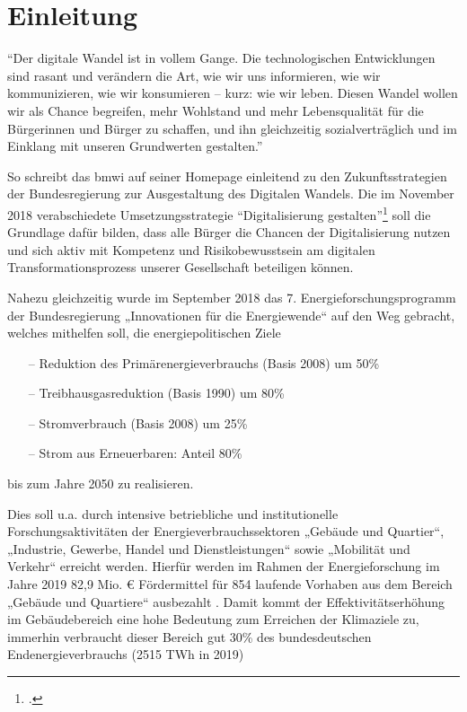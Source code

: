 
\chapter{Einleitung}
\enquote{Der digitale Wandel ist in vollem Gange. Die technologischen Entwicklungen sind rasant und verändern die Art, wie wir uns informieren, wie wir kommunizieren, wie wir konsumieren – kurz: wie wir leben. Diesen Wandel wollen wir als Chance begreifen, mehr Wohlstand und mehr Lebensqualität für die Bürgerinnen und Bürger zu schaffen, und ihn gleichzeitig sozialverträglich und im Einklang mit unseren Grundwerten gestalten.} \cite{bmwi2021}

So schreibt das \gls{bmwi} auf seiner Homepage einleitend zu den Zukunftsstrategien der Bundesregierung zur Ausgestaltung des Digitalen Wandels. Die im November 2018 verabschiedete Umsetzungsstrategie \enquote{Digitalisierung gestalten}\footcite{bundesregierung2020} soll die Grundlage dafür bilden, dass alle Bürger die Chancen der Digitalisierung nutzen und sich aktiv mit Kompetenz und Risikobewusstsein am digitalen Transformationsprozess unserer Gesellschaft beteiligen können. 

Nahezu gleichzeitig wurde im September 2018 das 7. Energieforschungsprogramm der Bundesregierung „Innovationen für die Energiewende“ auf den Weg gebracht, welches mithelfen soll, die energiepolitischen Ziele 
\begin{itemize}
    \itemsep0em
    \item[--] Reduktion des Primärenergieverbrauchs (Basis 2008) um 50\%
    \item[--] Treibhausgasreduktion (Basis 1990) um 80\%
    \item[--] Stromverbrauch (Basis 2008) um 25\%
    \item[--] Strom aus Erneuerbaren: Anteil 80\%
\end{itemize}
bis zum Jahre 2050 zu realisieren.

Dies soll u.a. durch intensive betriebliche und institutionelle Forschungsaktivitäten der Energieverbrauchssektoren „Gebäude und Quartier“, „Industrie, Gewerbe, Handel und Dienstleistungen“ sowie „Mobilität und Verkehr“ erreicht werden. Hierfür werden im Rahmen der Energieforschung im Jahre 2019 82,9 Mio. € Fördermittel für 854 laufende Vorhaben aus dem Bereich „Gebäude und Quartiere“ ausbezahlt \cite[Seite~80]{ptj2019}. Damit kommt der Effektivitätserhöhung im Gebäudebereich eine hohe Bedeutung zum Erreichen der Klimaziele zu, immerhin verbraucht dieser Bereich gut 30\% des bundesdeutschen Endenergieverbrauchs (2515 TWh in 2019)

